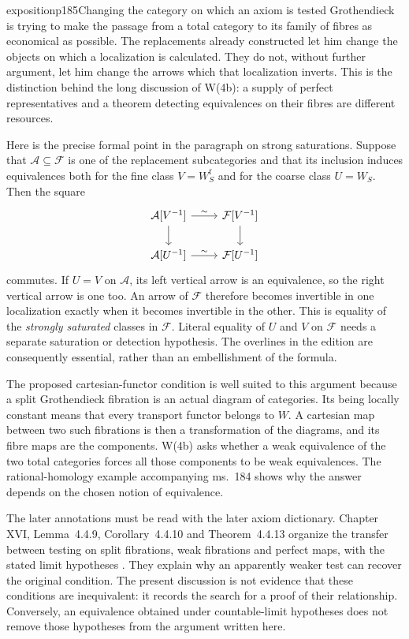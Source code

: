 \begin{dcomment}{exposition}{p185}{Changing the category on which an axiom is tested}
Grothendieck is trying to make the passage from a total category to its family of fibres as economical as possible. The replacements already constructed let him change the objects on which a localization is calculated. They do not, without further argument, let him change the arrows which that localization inverts. This is the distinction behind the long discussion of W(4b): a supply of perfect representatives and a theorem detecting equivalences on their fibres are different resources.

Here is the precise formal point in the paragraph on strong saturations. Suppose that $\mathcal A\subseteq\mathcal F$ is one of the replacement subcategories and that its inclusion induces equivalences both for the fine class $V=W_S^{\mathrm f}$ and for the coarse class $U=W_S$. Then the square
\[
\begin{tikzcd}
\mathcal A[V^{-1}]\arrow[r,"\sim"]\arrow[d]&\mathcal F[V^{-1}]\arrow[d]\\
\mathcal A[U^{-1}]\arrow[r,"\sim"]&\mathcal F[U^{-1}]
\end{tikzcd}
\]
commutes. If $U=V$ on $\mathcal A$, its left vertical arrow is an equivalence, so the right vertical arrow is one too. An arrow of $\mathcal F$ therefore becomes invertible in one localization exactly when it becomes invertible in the other. This is equality of the \emph{strongly saturated} classes in $\mathcal F$. Literal equality of $U$ and $V$ on $\mathcal F$ needs a separate saturation or detection hypothesis. The overlines in the edition are consequently essential, rather than an embellishment of the formula.

The proposed cartesian-functor condition is well suited to this argument because a split Grothendieck fibration is an actual diagram of categories. Its being locally constant means that every transport functor belongs to $W$. A cartesian map between two such fibrations is then a transformation of the diagrams, and its fibre maps are the components. W(4b) asks whether a weak equivalence of the two total categories forces all those components to be weak equivalences. The rational-homology example accompanying ms.~184 shows why the answer depends on the chosen notion of equivalence.

The later annotations must be read with the later axiom dictionary. Chapter XVI, Lemma~4.4.9, Corollary~4.4.10 and Theorem~4.4.13 organize the transfer between testing on split fibrations, weak fibrations and perfect maps, with the stated limit hypotheses \citep{GrothendieckDerivateursXVI}. They explain why an apparently weaker test can recover the original condition. The present discussion is not evidence that these conditions are inequivalent: it records the search for a proof of their relationship. Conversely, an equivalence obtained under countable-limit hypotheses does not remove those hypotheses from the argument written here.
\end{dcomment}

